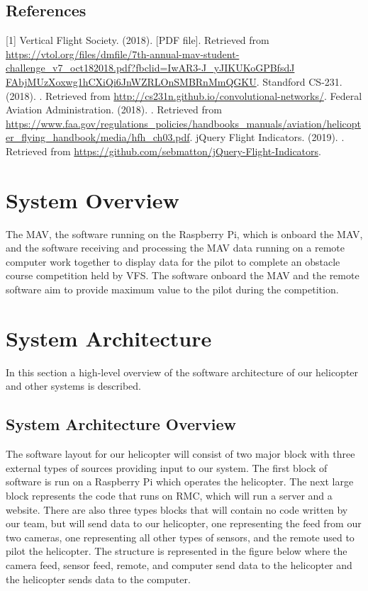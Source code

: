 \documentclass[onecolumn, oneside, letterpaper, draftclsnofoot, 10pt, compsoc]{IEEEtran}
\begin{document}
\subsection{References}
[1]
\newblock Vertical Flight Society. (2018).
 [PDF file].
\newblock Retrieved from \url{https://vtol.org/files/dmfile/7th-annual-mav-student-challenge_v7_oct182018.pdf?fbclid=IwAR3-J_yJIKUKoGPBfsdJ}\\ \url{FAbjMUzXoxwg1hCXiQi6JnWZRLOnSMBRnMmQGKU}.
\noindent \newline
[2]
\newblock Standford CS-231. (2018).
.
\newblock Retrieved from \url{http://cs231n.github.io/convolutional-networks/}.
\noindent \newline
[3]
\newblock Federal Aviation Administration. (2018).
.
\newblock Retrieved from
\url{https://www.faa.gov/regulations_policies/handbooks_manuals/aviation/helicopter_flying_handbook/media/hfh_ch03.pdf}.
\noindent \newline
[4]
\newblock jQuery Flight Indicators. (2019).
.
\newblock Retrieved from
\url{https://github.com/sebmatton/jQuery-Flight-Indicators}.
\noindent \newline

\section{System Overview}
The MAV, the software running on the Raspberry Pi, which is onboard the MAV, and the software receiving and processing the MAV data running on a remote computer work together to display data for the pilot to complete an obstacle course competition held by VFS. The software onboard the MAV and the remote software aim to provide maximum value to the pilot during the competition.

\section{System Architecture}
In this section a high-level overview of the software architecture of our helicopter and other systems is described.

\subsection{System Architecture Overview}
The software layout for our helicopter will consist of two major block with three external types of sources providing input to our system. The first block of software is run on a Raspberry Pi which operates the helicopter. The next large block represents the code that runs on RMC, which will run a server and a website. There are also three types blocks that will contain no code written by our team, but will send data to our helicopter, one representing the feed from our two cameras, one representing all other types of sensors, and the remote used to pilot the helicopter. The structure is represented in the figure below where the camera feed, sensor feed, remote, and computer send data to the helicopter and the helicopter sends data to the computer.
\end{document}
